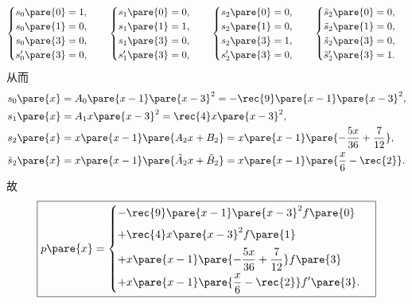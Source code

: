 \documentclass[hidelinks]{ctexart}
\begin{document}
\[ \begin{cases}
    s_0\pare{0} = 1, \\
    s_0\pare{1} = 0, \\
    s_0\pare{3} = 0, \\
    s'_0\pare{3} = 0,
\end{cases}\quad \begin{cases}
    s_1\pare{0} = 0, \\
    s_1\pare{1} = 1, \\
    s_1\pare{3} = 0, \\
    s'_1\pare{3} = 0,
\end{cases}\quad \begin{cases}
    s_2\pare{0} = 0, \\
    s_2\pare{1} = 0, \\
    s_2\pare{3} = 1, \\
    s'_2\pare{3} = 0,
\end{cases}\quad \begin{cases}
    \tilde{s}_2\pare{0} = 0, \\
    \tilde{s}_2\pare{1} = 0, \\
    \tilde{s}_2\pare{3} = 0, \\
    \tilde{s}'_2\pare{3} = 1.
\end{cases} \]
从而
\begin{align*}
    & s_0\pare{x} = A_0\pare{x-1}\pare{x-3}^2 = -\rec{9}\pare{x-1}\pare{x-3}^2, \\
    & s_1\pare{x} = A_1x\pare{x-3}^2 = \rec{4}x\pare{x-3}^2, \\
    & s_2\pare{x} = x\pare{x-1}\pare{A_2x + B_2} = x\pare{x-1}\pare{-\frac{5x}{36} + \frac{7}{12}}, \\
    & \tilde{s}_2\pare{x} = x\pare{x-1}\pare{\tilde{A}_2x + \tilde{B}_2} = x\pare{x-1}\pare{\frac{x}{6} - \rec{2}}.
\end{align*}
故
\begin{equation*}
    \boxed{p\pare{x} = \begin{cases}
        \displaystyle -\rec{9}\pare{x-1}\pare{x-3}^2f\pare{0} \\[.5em]
        \displaystyle +\rec{4}x\pare{x-3}^2f\pare{1} \\[.5em]
        \displaystyle + x\pare{x-1}\pare{-\frac{5x}{36} + \frac{7}{12}} f\pare{3} \\[.5em]
        \displaystyle + x\pare{x-1}\pare{\frac{x}{6} - \rec{2}} f'\pare{3}.
    \end{cases}}
\end{equation*}
\end{document}
